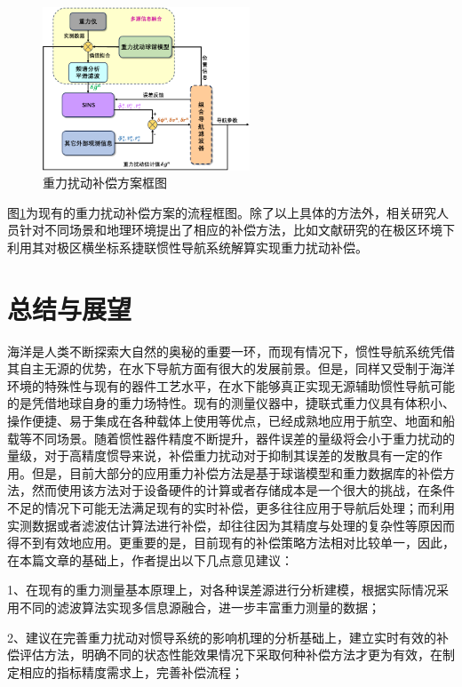 \documentclass[12pt,a4,utf8]{article}
\begin{document}
\begin{figure}[h]
      \centering
      \includegraphics[width=0.55\textwidth]{figure/fig_compensation-crop.pdf}
      \caption{\label{fig:compensation}重力扰动补偿方案框图}
\end{figure}

图\ref{fig:compensation}为现有的重力扰动补偿方案的流程框图。除了以上具体的方法外，相关研究人员针对不同场景和地理环境提出了相应的补偿方法，比如文献\cite{LIQIAN2022}研究的在极区环境下利用其对极区横坐标系捷联惯性导航系统解算实现重力扰动补偿。
\section{总结与展望}
海洋是人类不断探索大自然的奥秘的重要一环，而现有情况下，惯性导航系统凭借其自主无源的优势，在水下导航方面有很大的发展前景。但是，同样又受制于海洋环境的特殊性与现有的器件工艺水平，在水下能够真正实现无源辅助惯性导航可能的是凭借地球自身的重力场特性。现有的测量仪器中，捷联式重力仪具有体积小、操作便捷、易于集成在各种载体上使用等优点，已经成熟地应用于航空、地面和船载等不同场景。随着惯性器件精度不断提升，器件误差的量级将会小于重力扰动的量级，对于高精度惯导来说，补偿重力扰动对于抑制其误差的发散具有一定的作用。但是，目前大部分的应用重力补偿方法是基于球谐模型和重力数据库的补偿方法，然而使用该方法对于设备硬件的计算或者存储成本是一个很大的挑战，在条件不足的情况下可能无法满足现有的实时补偿，更多往往应用于导航后处理；而利用实测数据或者滤波估计算法进行补偿，却往往因为其精度与处理的复杂性等原因而得不到有效地应用。更重要的是，目前现有的补偿策略方法相对比较单一，因此，在本篇文章的基础上，作者提出以下几点意见建议：

1、在现有的重力测量基本原理上，对各种误差源进行分析建模，根据实际情况采用不同的滤波算法实现多信息源融合，进一步丰富重力测量的数据；

2、建议在完善重力扰动对惯导系统的影响机理的分析基础上，建立实时有效的补偿评估方法，明确不同的状态性能效果情况下采取何种补偿方法才更为有效，在制定相应的指标精度需求上，完善补偿流程；
\end{document}
